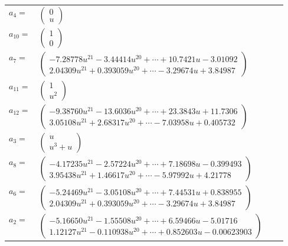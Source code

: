 \documentclass[1p]{elsarticle_modified}
\theoremstyle{definition}
\begin{document}
\begin{tabular}{m{7pt} m{180pt} m{7pt} m{180pt} }
\flushright $a_{4}=$&$\begin{pmatrix}0\\u\end{pmatrix}$ \\
\flushright $a_{10}=$&$\begin{pmatrix}1\\0\end{pmatrix}$ \\
\flushright $a_{7}=$&$\begin{pmatrix}-7.28778 u^{21}-3.44414 u^{20}+\cdots+10.7421 u-3.01092\\2.04309 u^{21}+0.393059 u^{20}+\cdots-3.29674 u+3.84987\end{pmatrix}$ \\
\flushright $a_{11}=$&$\begin{pmatrix}1\\u^2\end{pmatrix}$ \\
\flushright $a_{12}=$&$\begin{pmatrix}-9.38760 u^{21}-13.6036 u^{20}+\cdots+23.3843 u+11.7306\\3.05108 u^{21}+2.68317 u^{20}+\cdots-7.03958 u+0.405732\end{pmatrix}$ \\
\flushright $a_{3}=$&$\begin{pmatrix}u\\u^3+u\end{pmatrix}$ \\
\flushright $a_{8}=$&$\begin{pmatrix}-4.17235 u^{21}-2.57224 u^{20}+\cdots+7.18698 u-0.399493\\3.95438 u^{21}+1.46617 u^{20}+\cdots-5.97992 u+4.21778\end{pmatrix}$ \\
\flushright $a_{6}=$&$\begin{pmatrix}-5.24469 u^{21}-3.05108 u^{20}+\cdots+7.44531 u+0.838955\\2.04309 u^{21}+0.393059 u^{20}+\cdots-3.29674 u+3.84987\end{pmatrix}$ \\
\flushright $a_{2}=$&$\begin{pmatrix}-5.16650 u^{21}-1.55508 u^{20}+\cdots+6.59466 u-5.01716\\1.12127 u^{21}-0.110938 u^{20}+\cdots+0.852603 u-0.00623903\end{pmatrix}$ \\

\end{tabular}
\end{document}

